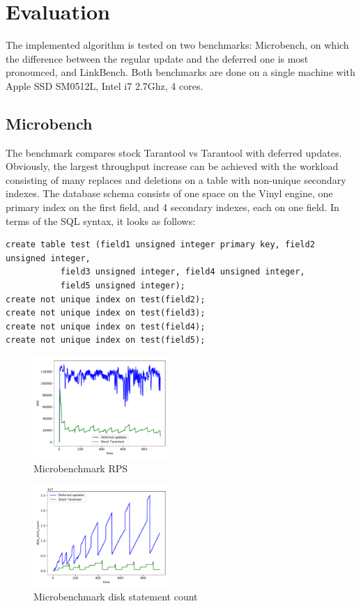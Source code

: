 \documentclass{vldb}
\begin{document}
\section{Evaluation}

The implemented algorithm is tested on two benchmarks: Microbench, on which the
difference between the regular update and the deferred one is most pronounced, and
LinkBench. Both benchmarks are done on a single machine with Apple SSD SM0512L,
Intel i7 2.7Ghz, 4 cores.

\subsection{Microbench}

The benchmark compares stock Tarantool vs Tarantool with deferred updates.
Obviously, the largest throughput increase can be achieved with the workload
consisting of many replaces and deletions on a table with non-unique secondary
indexes. The database schema consists of one space on the Vinyl engine, one primary
index on the first field, and 4 secondary indexes, each on one field. In terms of the
SQL syntax, it looks as follows:
\begin{verbatim}
create table test (field1 unsigned integer primary key, field2 unsigned integer,
		   field3 unsigned integer, field4 unsigned integer,
		   field5 unsigned integer);
create not unique index on test(field2);
create not unique index on test(field3);
create not unique index on test(field4);
create not unique index on test(field5);
\end{verbatim}

\begin{figure}
\centering
\includegraphics[width=0.46\textwidth]{rps_microbench}
\caption{Microbenchmark RPS}
\label{fig:rps_microbench}
\end{figure}

\begin{figure}
\centering
\includegraphics[width=0.46\textwidth]{disk_stmt_microbench}
\caption{Microbenchmark disk statement count}
\label{fig:disk_stmt_microbench}
\end{figure}
\end{document}
